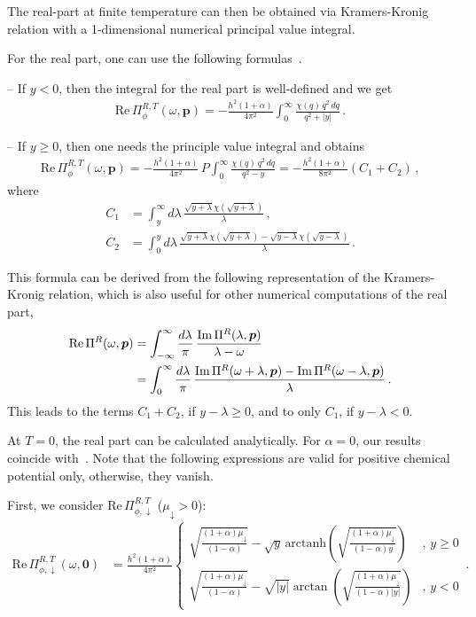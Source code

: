 The real-part at finite temperature can then be obtained via Kramers-Kronig relation with a 1-dimensional numerical principal value integral.

For the real part, one can use the following formulas~\cite{Hu2022}.

-- If $y < 0$, then the integral for the real part is well-defined and we get
\begin{align}
	\text{Re}\, \Pi^{R,T}_{\phi}(\omega, \bm{p}) = -
	\frac{h^2(1+\alpha)}{4\pi^2} \int_0^{\infty}
	\frac{\chi(q) \, q^2 \, dq}{q^2+|y|} \,.
\end{align}

-- If $y\geq 0$, then one needs the principle value integral and obtains~\cite{Hu2022}
\begin{align}
	\text{Re}\, \Pi^{R,T}_{\phi}(\omega, \bm{p}) =-
	\frac{h^2(1+\alpha)}{4\pi^2}\, P\int_0^{\infty}
	\frac{\chi(q) \, q^2 \, dq}{q^2-y} 
	= -\frac{h^2(1+\alpha)}{8\pi^2} (C_1 + C_2)\,,
\end{align}
where
\begin{align}
	C_1 &= \int_y^{\infty}
	d\lambda\, \frac{\sqrt{y+\lambda}\chi(\sqrt{y+\lambda})}{\lambda} \,, \\
	C_2 &= \int_0^y
	d\lambda\, \frac{\sqrt{y+\lambda}\chi(\sqrt{y+\lambda})-\sqrt{y-\lambda}\chi(\sqrt{y-\lambda})}{\lambda} \,.
\end{align}

This formula can be derived from the following representation of the Kramers-Kronig relation, which is also useful for other numerical computations of the real part,
\begin{align}
	\text{Re}\,\Pi^R(\omega,\bm{p}) &= \int_{-\infty}^{\infty}\frac{d\lambda}{\pi}\, \frac{\text{Im}\,\Pi^R(\lambda,\bm{p})}{\lambda-\omega} \notag \\
	&= \int_{0}^{\infty}\frac{d\lambda}{\pi}\, \frac{\text{Im}\,\Pi^R(\omega+\lambda,\bm{p})-\text{Im}\,\Pi^R(\omega-\lambda,\bm{p})}{\lambda} \,.
\end{align}
This leads to the terms $C_1 + C_2$, if $y-\lambda\geq 0$, and to only $C_1$, if $y-\lambda<0$.

At $T=0$, the real part can be calculated analytically. For $\alpha=0$, our results coincide with~\cite{Punk2010}. Note that the following expressions are valid for positive chemical potential only, otherwise, they vanish.

First, we consider $\text{Re}\,\Pi^{R,T}_{\phi,\downarrow}$  ($\mu_{\downarrow} > 0$):
\begin{align}
	\text{Re}\, \Pi^{R,T}_{\phi,\downarrow}(\omega,\bm{0}) &= \frac{h^2(1+\alpha)}{4\pi^2} 
	\begin{cases}
		\sqrt{\frac{(1+\alpha)\mu_{\downarrow}}{(1-\alpha)}}-\sqrt{y}\,
		\text{arctanh}\left(\sqrt{\frac{(1+\alpha)\mu_{\downarrow}}{(1-\alpha)y}}\right) & ,\, y \geq 0 \\
		\sqrt{\frac{(1+\alpha)\mu_{\downarrow}}{(1-\alpha)}} - \sqrt{|y|} \arctan\left( \sqrt{\frac{(1+\alpha)\mu_{\downarrow}}{(1-\alpha)|y|}}\right) & ,\, y < 0
	\end{cases}	\,.
\end{align}


